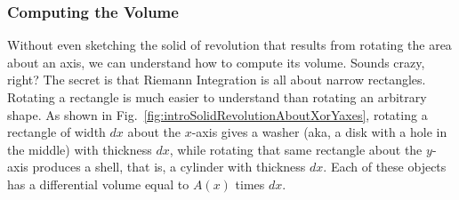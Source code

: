 \subsubsection{Computing the Volume}
Without even sketching the solid of revolution that results from rotating the area about an axis, we can understand how to compute its volume. Sounds crazy, right?  The secret is that Riemann Integration is all about narrow rectangles. Rotating a rectangle is much easier to understand than rotating an arbitrary shape. As shown in Fig.~\ref{fig:introSolidRevolutionAboutXorYaxes}, rotating a rectangle of width $dx$ about the $x$-axis gives a washer (aka, a disk with a hole in the middle) with thickness $dx$, while rotating that same rectangle about the $y$-axis produces a shell, that is, a cylinder with thickness $dx$. Each of these objects has a differential volume equal to $A(x)$ times $dx$.

\bigskip

